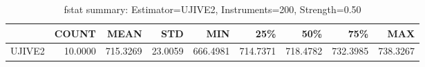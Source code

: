 \begin{table}[ht]
\centering
\caption{fstat summary: Estimator=UJIVE2, Instruments=200, Strength=0.50}
\begin{tabular}{lrrrrrrrr}
\toprule
 & COUNT & MEAN & STD & MIN & 25\% & 50\% & 75\% & MAX \\
\midrule
UJIVE2 & 10.0000 & 715.3269 & 23.0059 & 666.4981 & 714.7371 & 718.4782 & 732.3985 & 738.3267 \\
\bottomrule
\end{tabular}
\end{table}
